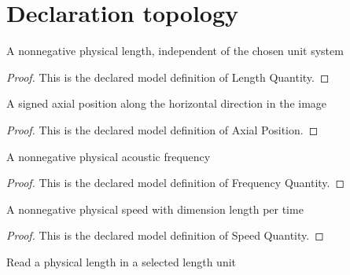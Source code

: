 \section{Declaration topology}
\begin{definition}
  \label{def:physics:phyx-mini-0320:phyxminiproblems-problemphyxmini0320-lengthquantity}
  A nonnegative physical length, independent of the chosen unit system
\end{definition}
\begin{proof}
  This is the declared model definition of Length Quantity.
\end{proof}
\begin{definition}
  \label{def:physics:phyx-mini-0320:phyxminiproblems-problemphyxmini0320-axialposition}
  A signed axial position along the horizontal direction in the image
\end{definition}
\begin{proof}
  This is the declared model definition of Axial Position.
\end{proof}
\begin{definition}
  \label{def:physics:phyx-mini-0320:phyxminiproblems-problemphyxmini0320-frequencyquantity}
  A nonnegative physical acoustic frequency
\end{definition}
\begin{proof}
  This is the declared model definition of Frequency Quantity.
\end{proof}
\begin{definition}
  \label{def:physics:phyx-mini-0320:phyxminiproblems-problemphyxmini0320-speedquantity}
  A nonnegative physical speed with dimension length per time
\end{definition}
\begin{proof}
  This is the declared model definition of Speed Quantity.
\end{proof}
\begin{definition}
  \label{def:physics:phyx-mini-0320:phyxminiproblems-problemphyxmini0320-lengthreadout}
  Read a physical length in a selected length unit
\end{definition}
